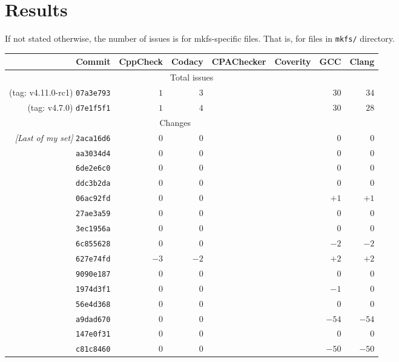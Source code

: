 
\chapter{Results}\label{chap:results}

If not stated otherwise, the number of issues is for mkfs-specific files.
That is, for files in {\tt mkfs/} directory.

\begin{table}[h]
\begin{tabular}{|r||r|r|r|r|r|r|}
\hline
Commit & CppCheck & Codacy & CPAChecker & Coverity & GCC & Clang \\
\hline
\hline
\multicolumn{7}{|c|}{Total issues}\\
\hline
(tag: v4.11.0-rc1) {\tt 07a3e793} & $1$ & $3$ & & & $30$ & $34$ \\
\hline
(tag: v4.7.0) {\tt d7e1f5f1} & $1$ & $4$ & & & $30$ & $28$ \\
\hline
\hline
\multicolumn{6}{|c|}{Changes}\\
\hline
{\em [Last of my set]} {\tt 2aca16d6} & 0 & 0 & & & 0 & 0 \\
\hline
{\tt aa3034d4} & 0 & 0 & & & 0 & 0 \\
\hline
{\tt 6de2e6c0} & 0 & 0 & & & 0 & 0 \\
\hline
{\tt ddc3b2da} & 0 & 0 & & & 0 & 0\\
\hline
{\tt 06ac92fd} & 0 & 0 & & & $+1$ & $+1$\\
\hline
{\tt 27ae3a59} & 0 & 0 & & & 0 & 0 \\
\hline
{\tt 3ec1956a} & 0 & 0 & & & 0 & 0 \\
\hline
{\tt 6c855628} & 0 & 0 & & & $-2$ & $-2$ \\
\hline
{\tt 627e74fd} & $-3$ & $-2$ & & & $+2$ & $+2$ \\
\hline
{\tt 9090e187} & 0 & 0 & & & 0 & 0 \\
\hline
{\tt 1974d3f1} & 0 & 0 & & & $-1$ & 0 \\
\hline
{\tt 56e4d368} & 0 & 0 & & & 0 & 0 \\
\hline
{\tt a9dad670} & 0 & 0 & & & $-54$ & $-54$ \\
\hline
{\tt 147e0f31} & 0 & 0 & & & 0 & 0 \\
\hline
{\tt c81c8460} & 0 & 0 & & & $-50$ & $-50$ \\

\end{tabular}
\end{table}
